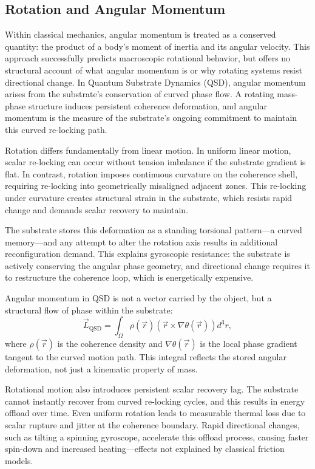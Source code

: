 \documentclass[entropy,article,submit,pdftex,moreauthors]{Definitions/mdpi}
\begin{document}
\subsection{Rotation and Angular Momentum}

Within classical mechanics, angular momentum is treated as a conserved quantity: the product of a body’s moment of inertia and its angular velocity. This approach successfully predicts macroscopic rotational behavior, but offers no structural account of what angular momentum is or why rotating systems resist directional change. In Quantum Substrate Dynamics (QSD), angular momentum arises from the substrate’s conservation of curved phase flow. A rotating mass-phase structure induces persistent coherence deformation, and angular momentum is the measure of the substrate’s ongoing commitment to maintain this curved re-locking path.

Rotation differs fundamentally from linear motion. In uniform linear motion, scalar re-locking can occur without tension imbalance if the substrate gradient is flat. In contrast, rotation imposes continuous curvature on the coherence shell, requiring re-locking into geometrically misaligned adjacent zones. This re-locking under curvature creates structural strain in the substrate, which resists rapid change and demands scalar recovery to maintain.

The substrate stores this deformation as a standing torsional pattern---a curved memory---and any attempt to alter the rotation axis results in additional reconfiguration demand. This explains gyroscopic resistance: the substrate is actively conserving the angular phase geometry, and directional change requires it to restructure the coherence loop, which is energetically expensive.

Angular momentum in QSD is not a vector carried by the object, but a structural flow of phase within the substrate:
\[
\vec{L}_{\text{QSD}} = \int_{\Omega} \rho(\vec{r}) \left( \vec{r} \times \nabla \theta(\vec{r}) \right) d^3r,
\]
where \( \rho(\vec{r}) \) is the coherence density and \( \nabla \theta(\vec{r}) \) is the local phase gradient tangent to the curved motion path. This integral reflects the stored angular deformation, not just a kinematic property of mass.

Rotational motion also introduces persistent scalar recovery lag. The substrate cannot instantly recover from curved re-locking cycles, and this results in energy offload over time. Even uniform rotation leads to measurable thermal loss due to scalar rupture and jitter at the coherence boundary. Rapid directional changes, such as tilting a spinning gyroscope, accelerate this offload process, causing faster spin-down and increased heating—effects not explained by classical friction models.
\end{document}
